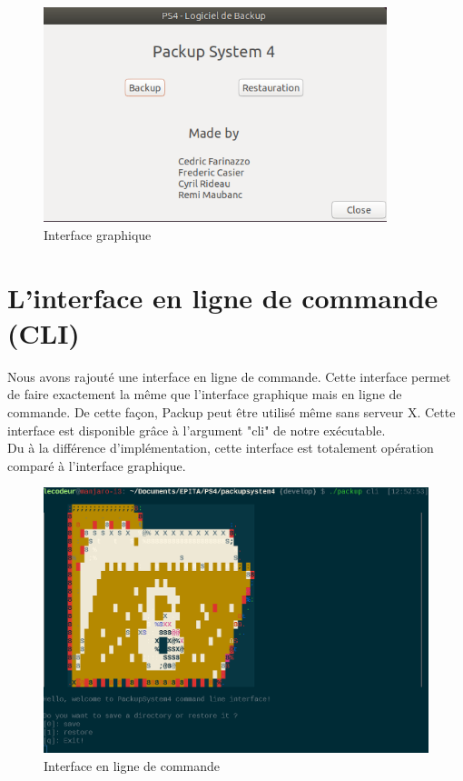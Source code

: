     \begin{figure}[!h]
		\centering
		\includegraphics[width=10cm]{images/gui_screen.png}
		\caption{Interface graphique}
		\label{Interface graphique}
	\end{figure}

\newpage

\section{L'interface en ligne de commande (CLI)}
    Nous avons rajouté une interface en ligne de commande. Cette interface permet de faire exactement la même que l'interface graphique mais en ligne de commande. De cette façon, Packup peut être utilisé même sans serveur X.
    Cette interface est disponible grâce à l'argument "cli" de notre exécutable. \\
    
    Du à la différence d'implémentation, cette interface est totalement opération comparé à l'interface graphique.

    \begin{figure}[!h]
		\centering
		\includegraphics[width=15cm]{images/packup_cli.png}
		\caption{ Interface en ligne de commande }
		\label{ Interface en ligne de commande }
	\end{figure}
	
